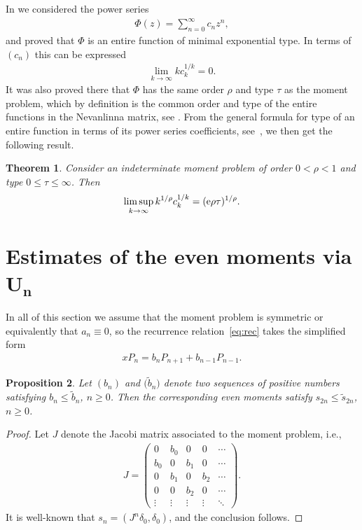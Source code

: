 \documentclass[pdftex]{sigma}
\numberwithin{equation}{section}
\newtheorem{thm}{Theorem}[section]
\newtheorem{prop}[thm]{Proposition}
\begin{document}
In \cite[Section 3]{B:S2} we considered the power series
\begin{gather*}
\Phi(z)=\sum_{n=0}^\infty c_nz^n,
\end{gather*}
and proved that $\Phi$ is an entire function of minimal exponential type. In terms of $(c_n)$ this
can be expressed
\begin{gather}\label{eq:minexpt}
\lim_{k\to\infty} k c_k^{1/k} =0.
\end{gather}
It was also proved there that $\Phi$ has the same order $\rho$ and type $\tau$ as the moment problem, which by definition is the common order and type of the entire functions in the Nevanlinna matrix, see \cite{B:P,B:P:H}. From the general formula for type of an entire function in terms of its power series coefficients, see~\cite{Le}, we then get the following result.

\begin{thm}\label{thm:otcn} Consider an indeterminate moment problem of order $0<\rho<1$ and type $0\le \tau\le \infty$. Then
\begin{gather}\label{eq:otcn}
\limsup_{k\to\infty} k^{1/\rho} c_k^{1/k} = ({\rm e} \rho \tau )^{1/\rho}.
\end{gather}
\end{thm}

\section[Estimates of the even moments via $U_n$]{Estimates of the even moments via $\boldsymbol{U_n}$}\label{section3}
In all of this section we assume that the moment problem is symmetric or equivalently that $a_n\equiv 0$, so the recurrence relation~\eqref{eq:rec} takes the simplified form
\begin{gather}\label{eq:recsym}
xP_n=b_nP_{n+1}+b_{n-1}P_{n-1}.
\end{gather}

\begin{prop}\label{thm:increasofbn}Let $(b_n)$ and $\big(\tilde{b}_n\big)$ denote two sequences of positive numbers satisfying $b_n\le \tilde{b}_n$, $n\ge 0$. Then the corresponding even moments satisfy $s_{2n}\le \tilde{s}_{2n}$, $n\ge 0$.
\end{prop}

\begin{proof}Let $J$ denote the Jacobi matrix associated to the moment problem, i.e.,
\begin{gather}\label{eq:Jacobimat}
J=\begin{pmatrix} 0 & b_0 & 0 & 0 & \cdots\\
 b_0 & 0 & b_1 & 0 & \cdots\\
 0 & b_1 & 0 & b_2 & \cdots\\
 0 & 0 & b_2 & 0 & \cdots\\
 \vdots & \vdots & \vdots & \vdots & \ddots
\end{pmatrix}.
\end{gather}
It is well-known that $s_n=(J^n\delta_0,\delta_0)$, and the conclusion follows.
\end{proof}
\end{document}
